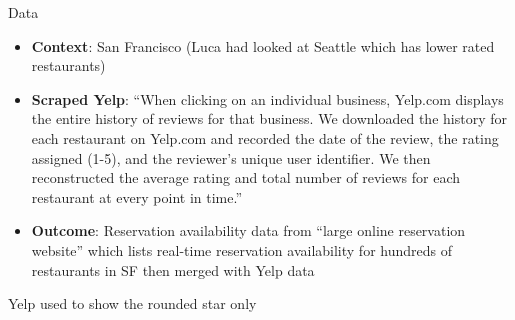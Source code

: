 \documentclass{beamer}
\begin{document}
\begin{frame}{Data}

\begin{itemize}
\item \textbf{Context}: San Francisco (Luca had looked at Seattle which has lower rated restaurants)
\item \textbf{Scraped Yelp}: ``When clicking on an individual business, Yelp.com displays the entire history of reviews for that business.  We downloaded the history for each restaurant on Yelp.com and recorded the date of the review, the rating assigned (1-5), and the reviewer's unique user identifier. We then reconstructed the average rating and total number of reviews for each restaurant at every point in time.''
\item \textbf{Outcome}: Reservation availability data from ``large online reservation website'' which lists real-time reservation availability for hundreds of restaurants in SF then merged with Yelp data

\end{itemize}

\end{frame}

\begin{frame}{Yelp used to show the rounded star only}
	
	\begin{figure}
	\end{figure}

	
	
\end{frame}
\end{document}
